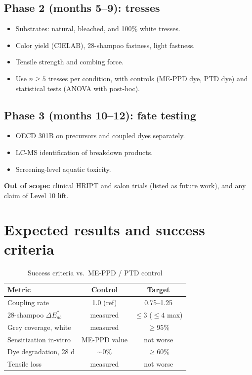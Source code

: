 \documentclass[11pt,a4paper]{article}
\begin{document}
\subsection{Phase 2 (months 5--9): tresses}
\begin{itemize}[leftmargin=1.5em]
\item Substrates: natural, bleached, and 100\% white tresses.
\item Color yield (CIELAB), 28-shampoo fastness, light fastness.
\item Tensile strength and combing force.
\item Use $n \geq 5$ tresses per condition, with controls (ME-PPD dye, PTD dye) and statistical tests (ANOVA with post-hoc).
\end{itemize}

\subsection{Phase 3 (months 10--12): fate testing}
\begin{itemize}[leftmargin=1.5em]
\item OECD 301B on precursors and coupled dyes separately.
\item LC-MS identification of breakdown products.
\item Screening-level aquatic toxicity.
\end{itemize}

\textbf{Out of scope:} clinical HRIPT and salon trials (listed as future work), and any claim of Level 10 lift.

\section{Expected results and success criteria}

\begin{table}[h]
\centering
\caption{Success criteria vs.\ ME-PPD / PTD control}
\label{tab:criteria}
\begin{tabular}{@{}lcc@{}}
\toprule
Metric & Control & Target \\
\midrule
Coupling rate & 1.0 (ref) & 0.75--1.25 \\
28-shampoo $\Delta E^*_{ab}$ & measured & $\leq 3$ ($\leq 4$ max) \\
Grey coverage, white & measured & $\geq 95\%$ \\
Sensitization in-vitro & ME-PPD value & not worse \\
Dye degradation, 28 d & $\sim$0\% & $\geq 60\%$ \\
Tensile loss & measured & not worse \\
\bottomrule
\end{tabular}
\end{table}
\end{document}
